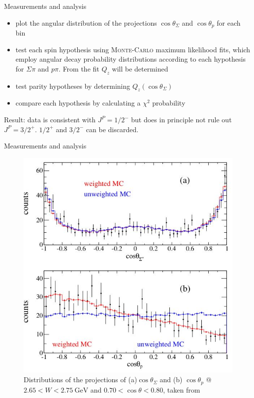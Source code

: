 \documentclass[11pt,aspectratio=1610,dvipsnames]{beamer}
\begin{document}
\begin{frame}{Measurements and analysis}
	\begin{minipage}{\linewidth}
	\begin{tcolorbox}[colback=black!10,colframe=gray!20!black,title=Analysis procedure] 
		\begin{itemize}
			\item plot the angular distribution of the projections  $\cos\theta_\Sigma$ and $\cos\theta_p$ for each bin
			\item test each spin hypothesis using \textsc{Monte-Carlo} maximum likelihood fits, which employ angular decay probability distributions according to each hypothesis for $\Sigma\pi$ and $p\pi$. From the fit $Q_z$ will be determined
			\item test parity hypotheses by determining $Q_z(\cos\theta_\Sigma)$
			\item compare each hypothesis by calculating a $\chi^2$ probability
		\end{itemize}
	\end{tcolorbox}	
Result: data is consistent with $J^P=1/2^-$ but does in principle not rule out $J^P=3/2^+$. $1/2^+$ and $3/2^-$ can be discarded.
\end{minipage}

\end{frame}
\begin{frame}{Measurements and analysis}
		\begin{figure}
			\centering
			\includegraphics[width=.5\linewidth]{angular_dist}
			\caption{Distributions of the projections of (a)$\cos\theta_\Sigma$ and (b) $\cos\theta_p$ @ $2.65<W<\SI{2.75}{\giga\eV}$ and $0.70<\cos\theta<0.80$, taken from \citet{spinparity}}
		\end{figure}

\end{frame}
\end{document}
